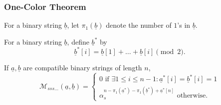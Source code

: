 \documentclass[pdf]{beamer}
\def\ul#1{\underline{#1}}
\def\MM{\mathcal M}
\begin{document}
\begin{frame}
	\frametitle{One-Color Theorem}
	\begin{definition}
	For a binary string $\ul b$, let $\pi_1(\ul b)$ denote the number of $1$'s in $\ul b$.
	\end{definition}
	\begin{definition}
	For a binary string $\ul b$, define $\ul b^\ast$ by
	\[ \ul b^\ast [i] = \ul b[1] + \dots + \ul b[i] \pmod{2}. \]
	\end{definition}
	\pause
	\begin{theorem}
	If $\ul a, \ul b$ are compatible binary strings of length $n$,
	\[
		\MM_{sss\dots} \left( \ul a, \ul b \right)
		=
		\begin{cases}
			0 \text{ if } \exists 1 \le i \le n-1: \ul a^\ast[i] = \ul b^\ast[i] = 1 \\
			\alpha_s^{n - \pi_1(\ul a^\ast) - \pi_1(\ul b^\ast) + \ul a^\ast[n]} \text{ otherwise}.
		\end{cases}
	\]
	\end{theorem}
\end{frame}
\end{document}

